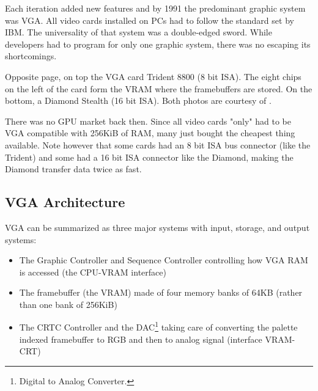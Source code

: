 \documentclass[book.tex]{subfiles}
\begin{document}
Each iteration added new features and by 1991 the predominant graphic system was VGA. All video cards installed on PCs had to follow the standard set by IBM. The universality of that system was a double-edged sword. While developers had to program for only one graphic system, there was no escaping its shortcomings.\\
\par
Opposite page, on top the VGA card Trident 8800 (8 bit ISA). The eight chips on the left of the card form the VRAM where the framebuffers are stored\protect\footnotemark. On the bottom, a Diamond Stealth (16 bit ISA). Both photos are courtesy of .
\pagebreak

\begin{figure}[H] 
  \centering 
  
\end{figure}
\par
\begin{figure}[H] 
  \centering 
\end{figure}
\pagebreak





 There was no GPU market back then. Since all video cards "only" had to be VGA compatible with 256KiB of RAM, many just bought the cheapest thing available. Note however that some cards had an 8 bit ISA bus connector (like the Trident) and some had a 16 bit ISA connector like the Diamond, making the Diamond transfer data twice as fast.\\
\par




\subsection{VGA Architecture}

VGA can be summarized as three major systems with input, storage, and output systems:
\begin{itemize}
\item The Graphic Controller and Sequence Controller controlling how VGA RAM is accessed (the CPU-VRAM interface)
\item The framebuffer (the VRAM) made of four memory banks of 64KB (rather than one bank of 256KiB)
\item The CRTC Controller and the DAC\footnote{Digital to Analog Converter.} taking care of converting the palette indexed framebuffer to RGB and then to analog signal (interface VRAM-CRT)
\end{itemize}
\end{document}
